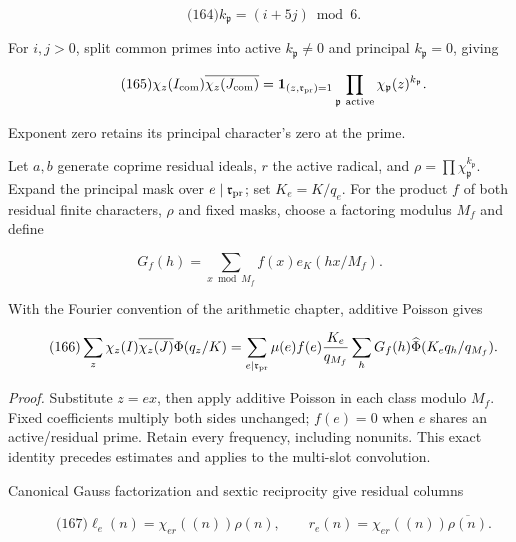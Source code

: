 \hypertarget{ma:net}{}

\label{ma:net}

\[
\qquad\text{(164)}
 k_{\mathfrak p}=(i+5j)\bmod6.
\]

For \(i,j>0\), split common primes into active \(k_{\mathfrak p}\ne0\) and principal \(k_{\mathfrak p}=0\), giving

\hypertarget{ma:common-mask}{}

\label{ma:common-mask}

\[
\qquad\text{(165)}
 \chi_z(I_{\rm com})\overline{\chi_z(J_{\rm com})}
 =\mathbf1_{(z,\mathfrak r_{\rm pr})=1}
       \prod_{\mathfrak p\ \mathrm{active}}\chi_{\mathfrak p}(z)^{k_{\mathfrak p}}.
\]

Exponent zero retains its principal character's zero at the prime.

Let \(a,b\) generate coprime residual ideals, \(r\) the active radical, and \(\rho=\prod\chi_{\mathfrak p}^{k_{\mathfrak p}}\). Expand the principal mask over \(e\mid\mathfrak r_{\rm pr}\); set \(K_e=K/q_e\). For the product \(f\) of both residual finite characters, \(\rho\) and fixed masks, choose a factoring modulus \(M_f\) and define

\[
G_f(h)=\sum_{x\bmod M_f}f(x)e_K(hx/M_f).
\]

With the Fourier convention of the arithmetic chapter, additive Poisson gives

\hypertarget{ma:first-transform}{}

\label{ma:first-transform}

\[
\qquad\text{(166)}
 \sum_z\chi_z(I)\overline{\chi_z(J)}\Phi(q_z/K)
 =\sum_{e\mid\mathfrak r_{\rm pr}}\mu(e)f(e)
       \frac{K_e}{q_{M_f}}\sum_hG_f(h)
                  \widehat\Phi(K_eq_h/q_{M_f}).
\]

\emph{Proof.} Substitute \(z=ex\), then apply additive Poisson in each class modulo \(M_f\). Fixed coefficients multiply both sides unchanged; \(f(e)=0\) when \(e\) shares an active/residual prime. Retain every frequency, including nonunits. This exact identity precedes estimates and applies to the multi-slot convolution.

Canonical Gauss factorization and sextic reciprocity give residual columns

\hypertarget{ma:first-columns}{}

\label{ma:first-columns}

\[
\qquad\text{(167)}
 \ell_e(n)=\chi_{er}((n))\rho(n),\qquad
 r_e(n)=\chi_{er}((n))\overline{\rho(n)}.
\]

